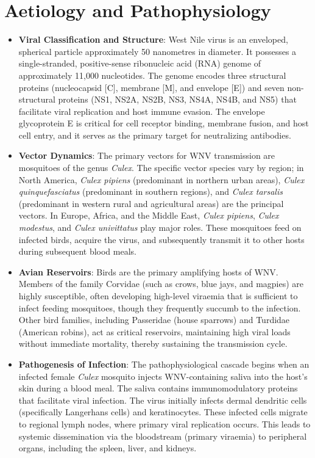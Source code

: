 \section*{Aetiology and Pathophysiology}
\begin{itemize}
    \item \textbf{Viral Classification and Structure}: West Nile virus is an enveloped, spherical particle approximately 50 nanometres in diameter. It possesses a single-stranded, positive-sense ribonucleic acid (RNA) genome of approximately 11,000 nucleotides. The genome encodes three structural proteins (nucleocapsid [C], membrane [M], and envelope [E]) and seven non-structural proteins (NS1, NS2A, NS2B, NS3, NS4A, NS4B, and NS5) that facilitate viral replication and host immune evasion. The envelope glycoprotein E is critical for cell receptor binding, membrane fusion, and host cell entry, and it serves as the primary target for neutralizing antibodies.
    \item \textbf{Vector Dynamics}: The primary vectors for WNV transmission are mosquitoes of the genus \textit{Culex}. The specific vector species vary by region; in North America, \textit{Culex pipiens} (predominant in northern urban areas), \textit{Culex quinquefasciatus} (predominant in southern regions), and \textit{Culex tarsalis} (predominant in western rural and agricultural areas) are the principal vectors. In Europe, Africa, and the Middle East, \textit{Culex pipiens}, \textit{Culex modestus}, and \textit{Culex univittatus} play major roles. These mosquitoes feed on infected birds, acquire the virus, and subsequently transmit it to other hosts during subsequent blood meals.
    \item \textbf{Avian Reservoirs}: Birds are the primary amplifying hosts of WNV. Members of the family Corvidae (such as crows, blue jays, and magpies) are highly susceptible, often developing high-level viraemia that is sufficient to infect feeding mosquitoes, though they frequently succumb to the infection. Other bird families, including Passeridae (house sparrows) and Turdidae (American robins), act as critical reservoirs, maintaining high viral loads without immediate mortality, thereby sustaining the transmission cycle.
    \item \textbf{Pathogenesis of Infection}: The pathophysiological cascade begins when an infected female \textit{Culex} mosquito injects WNV-containing saliva into the host's skin during a blood meal. The saliva contains immunomodulatory proteins that facilitate viral infection. The virus initially infects dermal dendritic cells (specifically Langerhans cells) and keratinocytes. These infected cells migrate to regional lymph nodes, where primary viral replication occurs. This leads to systemic dissemination via the bloodstream (primary viraemia) to peripheral organs, including the spleen, liver, and kidneys.

\end{itemize}
